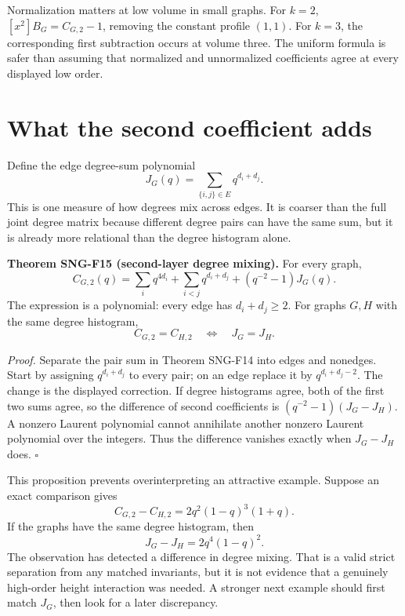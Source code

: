 \documentclass[
  11pt,
  a4paper,
]{report}
\begin{document}
Normalization matters at low volume in small graphs. For \(k=2\),
\([x^2]B_G=C_{G,2}-1\), removing the constant profile \((1,1)\). For
\(k=3\), the corresponding first subtraction occurs at volume three. The
uniform formula is safer than assuming that normalized and unnormalized
coefficients agree at every displayed low order.

\hypertarget{what-the-second-coefficient-adds}{%
\section{What the second coefficient
adds}\label{what-the-second-coefficient-adds}}

Define the edge degree-sum polynomial \[
J_G(q)=\sum_{\{i,j\}\in E}q^{d_i+d_j}.
\] This is one measure of how degrees mix across edges. It is coarser
than the full joint degree matrix because different degree pairs can
have the same sum, but it is already more relational than the degree
histogram alone.

\textbf{Theorem SNG-F15 (second-layer degree mixing).} For every graph,
\[
C_{G,2}(q)=\sum_iq^{4d_i}
+\sum_{i<j}q^{d_i+d_j}
+(q^{-2}-1)J_G(q).
\] The expression is a polynomial: every edge has \(d_i+d_j\ge2\). For
graphs \(G,H\) with the same degree histogram, \[
C_{G,2}=C_{H,2}\quad\Longleftrightarrow\quad J_G=J_H.
\]

\emph{Proof.} Separate the pair sum in Theorem SNG-F14 into edges and
nonedges. Start by assigning \(q^{d_i+d_j}\) to every pair; on an edge
replace it by \(q^{d_i+d_j-2}\). The change is the displayed correction.
If degree histograms agree, both of the first two sums agree, so the
difference of second coefficients is \((q^{-2}-1)(J_G-J_H)\). A nonzero
Laurent polynomial cannot annihilate another nonzero Laurent polynomial
over the integers. Thus the difference vanishes exactly when \(J_G-J_H\)
does. \(\square\)

This proposition prevents overinterpreting an attractive example.
Suppose an exact comparison gives \[
C_{G,2}-C_{H,2}=2q^2(1-q)^3(1+q).
\] If the graphs have the same degree histogram, then \[
J_G-J_H=2q^4(1-q)^2.
\] The observation has detected a difference in degree mixing. That is a
valid strict separation from any matched invariants, but it is not
evidence that a genuinely high-order height interaction was needed. A
stronger next example should first match \(J_G\), then look for a later
discrepancy.
\end{document}
